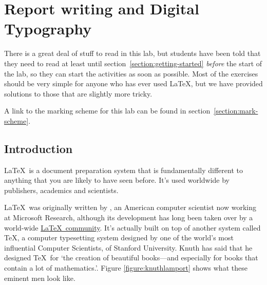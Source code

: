 



% 
\setlength{\parskip}{\parskipdefault}
\setlength{\parindent}{\parindentdefault}
\fancyheadoffset{0cm} %

\chapter{Report writing and Digital Typography}
\begin{refsection}
  
  \minitoc


\begin{demonote}
  There is a great deal of stuff to read in this lab, but students
  have been told that they need to read at least until
  section~\ref{section:getting-started} \emph{before} the start of the
  lab, so they can start the activities as soon as possible. Most of
  the exercises should be very simple for anyone who has ever used
  \LaTeX, but we have provided solutions to those that are slightly
  more tricky.

  A link to the  marking scheme for this lab can be found in section~\ref{section:mark-scheme}.

\end{demonote}

\section{Introduction}

\LaTeX\ is a document preparation system that is fundamentally
different to anything that you are likely to have seen before. It's
used worldwide by publishers, academics and scientists.

\LaTeX\ was originally written by , an American computer scientist now working at Microsoft
Research, although its development has long been taken over by a
world-wide \href{http://www.latex-project.org}{\LaTeX\ community}.
It's actually built on top of another system called \TeX, a computer
typesetting system designed by one of the world's most influential
Computer Scientists,  of
Stanford University. Knuth has said that he designed \TeX\ for `the
creation of beautiful books---and especially for books that contain a
lot of mathematics.'\citep{knuth1984}. Figure
\ref{figure:knuthlamport} shows what these eminent men look like.


\end{refsection}

